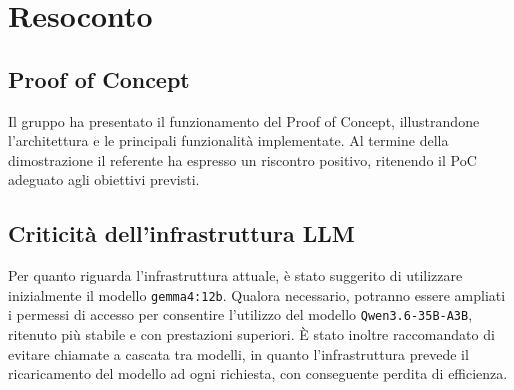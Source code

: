 \section{Resoconto}

\subsection{Proof of Concept}

Il gruppo ha presentato il funzionamento del Proof of Concept, illustrandone l'architettura e le principali funzionalità implementate. Al termine della dimostrazione il referente ha espresso un riscontro positivo, ritenendo il PoC adeguato agli obiettivi previsti.

\subsection{Criticità dell'infrastruttura LLM}

Per quanto riguarda l’infrastruttura attuale, è stato suggerito di utilizzare inizialmente il modello  \texttt{gemma4:12b}. Qualora necessario, potranno essere ampliati i permessi di accesso per consentire l’utilizzo del modello \texttt{Qwen3.6-35B-A3B}, ritenuto più stabile e con prestazioni superiori. È stato inoltre raccomandato di evitare chiamate a cascata tra modelli, in quanto l’infrastruttura prevede il ricaricamento del modello ad ogni richiesta, con conseguente perdita di efficienza.


